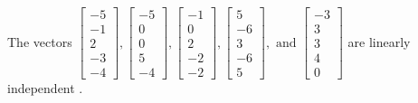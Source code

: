 \begin{exercise}
\begin{exerciseStatement}
  \end{exerciseStatement}
  \begin{exerciseAnswer}
   The vectors \(\left[\begin{array}{r}
-5 \\
-1 \\
2 \\
-3 \\
-4
\end{array}\right] , \left[\begin{array}{r}
-5 \\
0 \\
0 \\
5 \\
-4
\end{array}\right] , \left[\begin{array}{r}
-1 \\
0 \\
2 \\
-2 \\
-2
\end{array}\right] , \left[\begin{array}{r}
5 \\
-6 \\
3 \\
-6 \\
5
\end{array}\right] , \text{ and } \left[\begin{array}{r}
-3 \\
3 \\
3 \\
4 \\
0
\end{array}\right]\) are 
  	 linearly independent  .
  


  \end{exerciseAnswer}
\end{exercise}